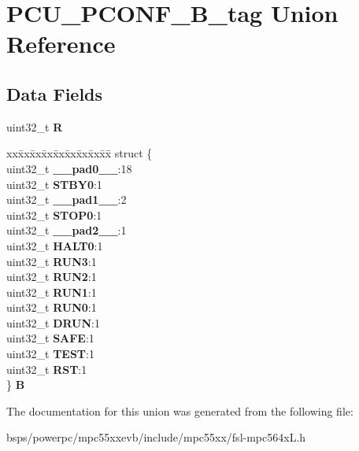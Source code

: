\hypertarget{unionPCU__PCONF__32B__tag}{}\section{P\+C\+U\+\_\+\+P\+C\+O\+N\+F\+\_\+B\+\_\+tag Union Reference}
\label{unionPCU__PCONF__32B__tag}
\subsection*{Data Fields}
\begin{DoxyCompactItemize}
\item 
\mbox{\label{unionPCU__PCONF__32B__tag_ac96dd26348a843e778670e19a81ecf2e}} 
uint32\+\_\+t {\bfseries R}
\item 
\mbox{\label{unionPCU__PCONF__32B__tag_a527bbc72028ebaa1f9ae65f84965f227}} 
\begin{tabbing}
xx\=xx\=xx\=xx\=xx\=xx\=xx\=xx\=xx\=\kill
struct \{\\
\>uint32\_t {\bfseries \_\_pad0\_\_}:18\\
\>uint32\_t {\bfseries STBY0}:1\\
\>uint32\_t {\bfseries \_\_pad1\_\_}:2\\
\>uint32\_t {\bfseries STOP0}:1\\
\>uint32\_t {\bfseries \_\_pad2\_\_}:1\\
\>uint32\_t {\bfseries HALT0}:1\\
\>uint32\_t {\bfseries RUN3}:1\\
\>uint32\_t {\bfseries RUN2}:1\\
\>uint32\_t {\bfseries RUN1}:1\\
\>uint32\_t {\bfseries RUN0}:1\\
\>uint32\_t {\bfseries DRUN}:1\\
\>uint32\_t {\bfseries SAFE}:1\\
\>uint32\_t {\bfseries TEST}:1\\
\>uint32\_t {\bfseries RST}:1\\
\} {\bfseries B}\\

\end{tabbing}\end{DoxyCompactItemize}


The documentation for this union was generated from the following file\+:\begin{DoxyCompactItemize}
\item 
bsps/powerpc/mpc55xxevb/include/mpc55xx/fsl-\/mpc564x\+L.\+h\end{DoxyCompactItemize}
